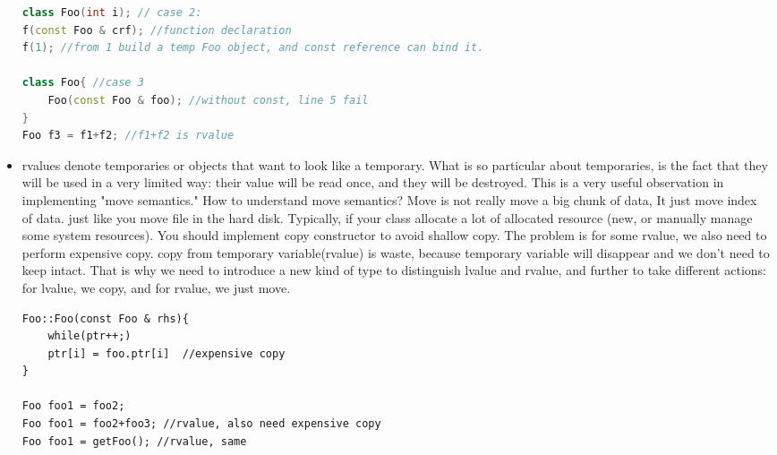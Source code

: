 \documentclass[a4paper,11pt,twoside]{book}
\begin{document}
\begin{itemize}
\begin{lstlisting}[frame=single, language=c++]
class Foo(int i); // case 2:
f(const Foo & crf); //function declaration
f(1); //from 1 build a temp Foo object, and const reference can bind it.

class Foo{ //case 3
	Foo(const Foo & foo); //without const, line 5 fail
}
Foo f3 = f1+f2; //f1+f2 is rvalue
\end{lstlisting}

	\item rvalues denote temporaries or objects that want to look like a temporary. What is so particular about temporaries, is the fact that they will be used in a very limited way: their value will be read once, and they will be destroyed. This is a very useful observation in implementing "move semantics."  How to understand move semantics? Move is not really move a big chunk of data, It just move index of data. just like you move file in the hard disk. Typically, if your class allocate a lot of allocated resource (new, or manually manage some system resources).  You should implement copy constructor to avoid shallow copy.  The problem is for some rvalue, we also need to perform expensive copy. copy from temporary variable(rvalue) is waste, because temporary variable will disappear and we don't need to keep intact. That is why we need to introduce a new kind of type to distinguish lvalue and rvalue, and further to take different actions: for lvalue, we copy, and for rvalue, we just move. 
\begin{lstlisting}[numbers=none]
	Foo::Foo(const Foo & rhs){
	while(ptr++;)
	ptr[i] = foo.ptr[i]  //expensive copy
}

Foo foo1 = foo2;
Foo foo1 = foo2+foo3; //rvalue, also need expensive copy
Foo foo1 = getFoo(); //rvalue, same
\end{lstlisting}  	

\end{itemize}
\end{document}
